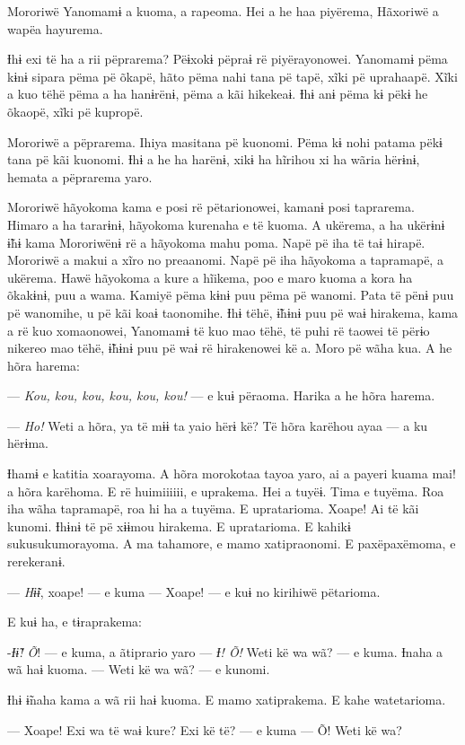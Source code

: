  Mororiwë Yanomamɨ a kuoma, a rapeoma. Hei a he haa piyërema,
Hãxoriwë a wapëa hayurema. 

Ɨhɨ exi të ha a rii pëprarema? Pëɨxokɨ pëpraɨ rë piyërayonowei. Yanomamɨ
pëma kɨnɨ sipara pëma pë õkapë, hãto pëma nahi tana pë tapë, xĩki pë
uprahaapë. Xĩki a kuo tëhë pëma a ha hanɨrënɨ, pëma a kãi hikekeaɨ. Ɨhɨ
anɨ pëma kɨ pëkɨ he õkaopë, xĩki pë kupropë. 

Mororiwë a pëprarema. Ihiya masitana pë kuonomi. Pëma kɨ nohi patama
pëkɨ tana pë kãi kuonomi. Ɨhɨ a he ha harënɨ, xikɨ ha hĩrihou xi ha
wãria hërɨnɨ, hemata a pëprarema yaro. 

Mororiwë hãyokoma kama e posi rë pëtarionowei, kamanɨ posi taprarema.
Himaro a ha tararɨnɨ, hãyokoma kurenaha e të kuoma. A ukërema, a ha
ukërɨnɨ ɨ̃hɨ kama Mororiwënɨ rë a hãyokoma mahu poma. Napë pë iha të taɨ
hirapë. Mororiwë a makui a xĩro no preaanomi. Napë pë iha hãyokoma a
tapramapë, a ukërema. Hawë hãyokoma a kure a hĩikema, poo e maro kuoma a
kora ha õkakɨnɨ, puu a wama. Kamiyë pëma kɨnɨ puu pëma pë wanomi. Pata
të pënɨ puu pë wanomihe, u pë kãi koaɨ taonomihe. Ɨhɨ tëhë, ɨ̃hɨnɨ puu pë
waɨ hirakema, kama a rë kuo xomaonowei, Yanomamɨ të kuo mao tëhë, të
puhi rë taowei të përɨo nikereo mao tëhë, ɨ̃hɨnɨ puu pë waɨ rë
hirakenowei kë a. Moro pë wãha kua. A he hõra harema: 

--- \textit{Kou, kou, kou, kou, kou, kou!} --- e kuɨ përaoma. Harika a he hõra
harema. 

--- \textit{Ho!} Weti a hõra, ya të mɨɨ ta yaio hërɨ kë? Të hõra karëhou ayaa --- a
ku hërɨma. 

Ɨhamɨ e katitia xoarayoma. A hõra morokotaa tayoa yaro, ai a payeri
kuama mai! a hõra karëhoma. E rë huimiiiiii, e uprakema. Hei a tuyëɨ.
Tima e tuyëma. Roa iha wãha tapramapë, roa hi ha a tuyëma. E upratarioma. Xoape! Ai të kãi kunomi. Ɨhɨnɨ të pë xɨɨmou hirakema. E upratarioma. E kahikɨ sukusukumorayoma. A ma tahamore, e mamo
xatipraonomi. E paxëpaxëmoma, e rerekeranɨ. 

--- \textit{Hɨ̃ɨ}, xoape! --- e kuma --- Xoape! --- e kuɨ no kirihiwë pëtarioma. 

E kuɨ ha, e tɨraprakema: 

-\textit{Ɨɨ̃! Õ}! --- e kuma, a ãtiprario yaro --- \textit{Ɨ! Õ!} Weti kë wa wã? --- e
kuma. Ɨnaha a wã haɨ kuoma. --- Weti kë wa wã? --- e kunomi. 

Ɨhɨ ɨ̃naha kama a wã rii haɨ kuoma. E mamo xatiprakema. E kahe
watetarioma. 

--- Xoape! Exi wa të waɨ kure? Exi kë të? --- e kuma --- Õ! Weti kë wa?

